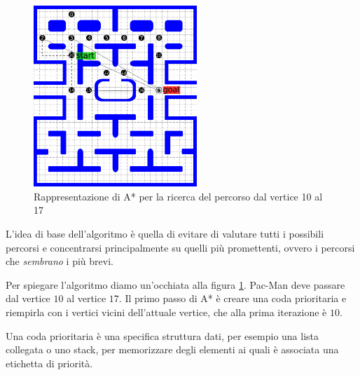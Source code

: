 \documentclass[8pt]{book}
\begin{document}
\begin{figure}
  \centering
  \includegraphics[width=0.55000\textwidth]{img/astar.png}
  \caption{Rappresentazione di A* per la ricerca del percorso dal vertice 10 al 17}
  \label{percorsoAStar1017}
\end{figure}



L'idea di base dell'algoritmo è quella di evitare di valutare tutti i possibili percorsi e concentrarsi principalmente su quelli più promettenti, ovvero i percorsi che \emph{sembrano} i più brevi.

Per spiegare l'algoritmo diamo un'occhiata alla figura \ref{percorsoAStar1017}. Pac-Man deve passare dal vertice $10$ al vertice $17$. Il primo passo di A* è creare una coda prioritaria e riempirla con i vertici vicini dell'attuale vertice, che alla prima iterazione è $10$.

Una coda prioritaria è una specifica struttura dati, per esempio una lista collegata o uno stack, per memorizzare degli elementi ai quali è associata una etichetta di priorità.
\end{document}
